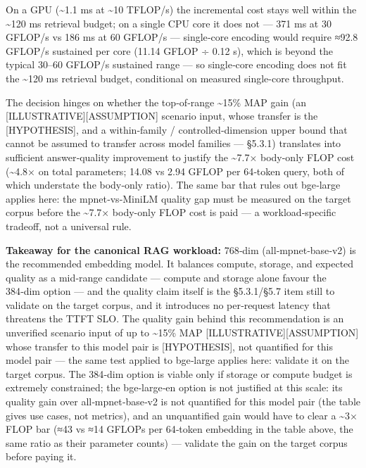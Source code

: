 On a GPU (\textasciitilde1.1 ms at \textasciitilde10 TFLOP/s) the
incremental cost stays well within the \textasciitilde120 ms retrieval
budget; on a single CPU core it does not --- 371 ms at 30 GFLOP/s vs 186
ms at 60 GFLOP/s --- single‑core encoding would require ≈92.8 GFLOP/s
sustained per core (11.14 GFLOP ÷ 0.12 s), which is beyond the typical
30--60 GFLOP/s sustained range --- so single‑core encoding does not fit
the \textasciitilde120 ms retrieval budget, conditional on measured
single-core throughput.

The decision hinges on whether the top‑of‑range \textasciitilde15\% MAP
gain (an \mbox{{[}ILLUSTRATIVE{]}}\hspace{0pt}\mbox{{[}ASSUMPTION{]}} scenario input, whose
transfer is the \mbox{{[}HYPOTHESIS{]}}, and a within‑family /
controlled‑dimension upper bound that cannot be assumed to transfer
across model families --- §5.3.1) translates into sufficient
answer‑quality improvement to justify the \textasciitilde7.7× body-only
FLOP cost (\textasciitilde4.8× on total parameters; 14.08 vs 2.94 GFLOP
per 64‑token query, both of which understate the body‑only ratio). The
same bar that rules out bge‑large applies here: the mpnet‑vs‑MiniLM
quality gap must be measured on the target corpus before the
\textasciitilde7.7× body-only FLOP cost is paid --- a workload‑specific
tradeoff, not a universal rule.

\textbf{Takeaway for the canonical RAG workload:} 768‑dim
(all‑mpnet‑base‑v2) is the recommended embedding model. It balances
compute, storage, and expected quality as a mid‑range candidate ---
compute and storage alone favour the 384‑dim option --- and the quality
claim itself is the §5.3.1/§5.7 item still to validate on the target
corpus, and it introduces no per‑request latency that threatens the TTFT
SLO. The quality gain behind this recommendation is an unverified
scenario input of up to \textasciitilde15\% MAP
\mbox{{[}ILLUSTRATIVE{]}}\hspace{0pt}\mbox{{[}ASSUMPTION{]}} whose transfer to this model pair is
\mbox{{[}HYPOTHESIS{]}}, not quantified for this model pair --- the same test
applied to bge‑large applies here: validate it on the target corpus. The
384‑dim option is viable only if storage or compute budget is extremely
constrained; the bge‑large‑en option is not justified at this scale: its
quality gain over all‑mpnet‑base‑v2 is not quantified for this model
pair (the table gives use cases, not metrics), and an unquantified gain
would have to clear a \textasciitilde3× FLOP bar (≈43 vs ≈14 GFLOPs per
64‑token embedding in the table above, the same ratio as their parameter
counts) --- validate the gain on the target corpus before paying it.

